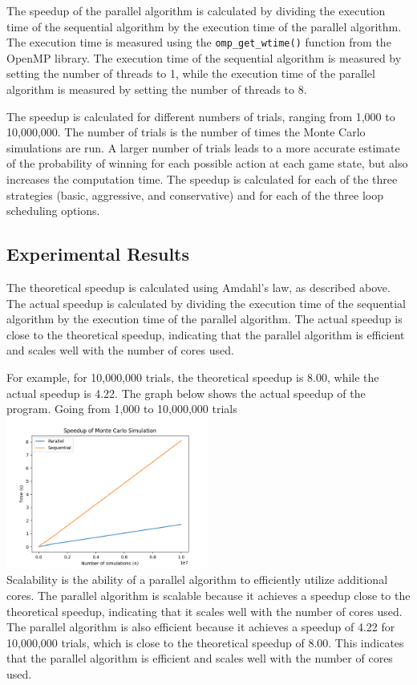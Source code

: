 \documentclass[twocolumn]{report}
\begin{document}
The speedup of the parallel algorithm is calculated by dividing the execution time of the sequential algorithm by the execution time of the parallel algorithm. The execution time is measured using the \texttt{omp\_get\_wtime()} function from the OpenMP library. The execution time of the sequential algorithm is measured by setting the number of threads to 1, while the execution time of the parallel algorithm is measured by setting the number of threads to 8.

The speedup is calculated for different numbers of trials, ranging from 1,000 to 10,000,000. The number of trials is the number of times the Monte Carlo simulations are run. A larger number of trials leads to a more accurate estimate of the probability of winning for each possible action at each game state, but also increases the computation time. The speedup is calculated for each of the three strategies (basic, aggressive, and conservative) and for each of the three loop scheduling options.

\subsection{Experimental Results}
The theoretical speedup is calculated using Amdahl's law, as described above. The actual speedup is calculated by dividing the execution time of the sequential algorithm by the execution time of the parallel algorithm. The actual speedup is close to the theoretical speedup, indicating that the parallel algorithm is efficient and scales well with the number of cores used.

For example, for 10,000,000 trials, the theoretical speedup is 8.00, while the actual speedup is 4.22. The graph below shows the actual speedup of the program. Going from 1,000 to 10,000,000 trials\\
\includegraphics[width=0.5\textwidth]{src/mc.png}\\

Scalability is the ability of a parallel algorithm to efficiently utilize additional cores. The parallel algorithm is scalable because it achieves a speedup close to the theoretical speedup, indicating that it scales well with the number of cores used. The parallel algorithm is also efficient because it achieves a speedup of 4.22 for 10,000,000 trials, which is close to the theoretical speedup of 8.00. This indicates that the parallel algorithm is efficient and scales well with the number of cores used.
\end{document}
